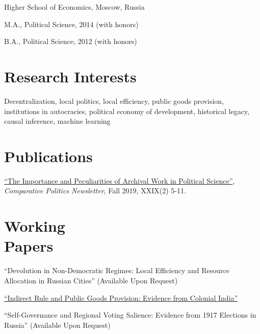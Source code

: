 \documentclass[margin,line,12pt]{res}
\newenvironment{list1}{
  \begin{list}{\ding{113}}{%
      \setlength{\itemsep}{0in}
      \setlength{\parsep}{0in} \setlength{\parskip}{0in}
      \setlength{\topsep}{0in} \setlength{\partopsep}{0in}
      \setlength{\leftmargin}{0.17in}}}{\end{list}}
\begin{document}
\begin{resume}
\vspace{-3mm}
{Higher School of Economics, Moscow, Russia}\\
\vspace*{-.1in}
\begin{list1}
 \item[] M.A., Political Science, 2014 (with honors) 
\item[] B.A., Political Science, 2012 (with honors)
\end{list1}

 \section{\sc Research Interests}
Decentralization, local politics, local efficiency, public goods provision,  institutions in autocracies, political economy of development, historical legacy, causal inference, machine learning


\section{\sc Publications}

\href{https://www.comparativepoliticsnewsletter.org/wp-content/uploads/2019/12/CP-Newsletter-Fall-19-CP-and-History.pdf}{``The Importance and Peculiarities of Archival Work in Political Science''}, \emph{Comparative Politics Newsletter}, Fall 2019, XXIX(2) 5-11.


\section{\sc Working \\ Papers}
``Devolution in Non-Democratic Regimes:
Local Efficiency and Resource Allocation in Russian Cities'' (Available Upon Request)

\vspace*{-2.5mm}

\href{https://papers.ssrn.com/sol3/papers.cfm?abstract_id=3689339}{``Indirect Rule and Public Goods Provision: Evidence from Colonial  India''}

\vspace*{-2.5mm}

``Self-Governance and Regional Voting Salience: Evidence from 1917 Elections in Russia'' (Available Upon Request)


\end{resume}
\end{document}
